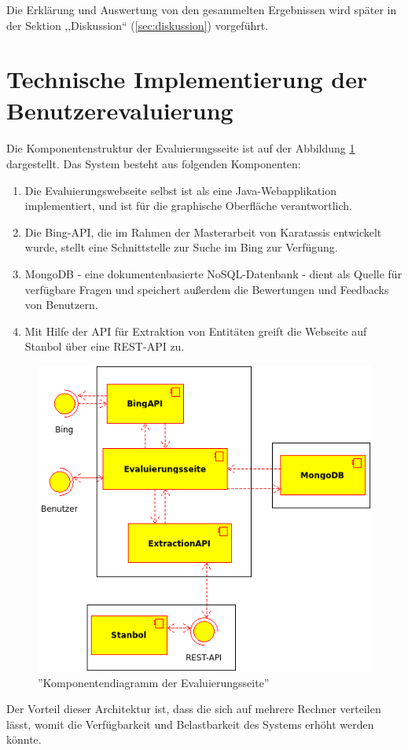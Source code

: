 Die Erklärung und Auswertung von den gesammelten Ergebnissen wird später in der Sektion ,,Diskussion`` (\ref{sec:diskussion}) vorgeführt. 

\section{Technische Implementierung der Benutzerevaluierung}
\paragraph{}
Die Komponentenstruktur der Evaluierungsseite ist auf der Abbildung \ref{fig:evalcomponents} dargestellt. Das System besteht aus folgenden Komponenten:
\begin{enumerate}
\item Die Evaluierungswebseite selbst ist als eine Java-Webapplikation implementiert, und ist für die graphische Oberfläche verantwortlich.
\item Die Bing-API, die im Rahmen der Masterarbeit von Karatassis\cite{Karatassis:15} entwickelt wurde, stellt eine Schnittstelle zur Suche im Bing zur Verfügung.
\item MongoDB - eine dokumentenbasierte NoSQL-Datenbank - dient als Quelle für verfügbare Fragen und speichert außerdem die Bewertungen und Feedbacks von Benutzern.
\item Mit Hilfe der API für Extraktion von Entitäten greift die Webseite auf Stanbol über eine REST-API zu. 
\end{enumerate}

\begin{figure}
\centering
\includegraphics[width=1\textwidth]{Bilder/evaluation_components.png}
\caption{''Komponentendiagramm der Evaluierungsseite''}
\label{fig:evalcomponents}
\end{figure}
Der Vorteil dieser Architektur ist, dass die sich auf mehrere Rechner verteilen lässt, womit die Verfügbarkeit und Belastbarkeit des Systems erhöht werden könnte.

